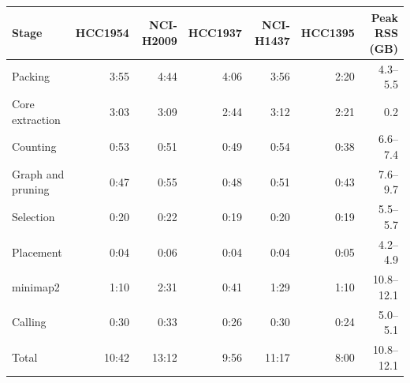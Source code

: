 \begin{tabular}{lrrrrrr}
\toprule
Stage & HCC1954 & NCI-H2009 & HCC1937 & NCI-H1437 & HCC1395 & Peak RSS (GB) \\
\midrule
Packing & 3:55 & 4:44 & 4:06 & 3:56 & 2:20 & 4.3--5.5 \\
Core extraction & 3:03 & 3:09 & 2:44 & 3:12 & 2:21 & 0.2 \\
Counting & 0:53 & 0:51 & 0:49 & 0:54 & 0:38 & 6.6--7.4 \\
Graph and pruning & 0:47 & 0:55 & 0:48 & 0:51 & 0:43 & 7.6--9.7 \\
Selection & 0:20 & 0:22 & 0:19 & 0:20 & 0:19 & 5.5--5.7 \\
Placement & 0:04 & 0:06 & 0:04 & 0:04 & 0:05 & 4.2--4.9 \\
minimap2 & 1:10 & 2:31 & 0:41 & 1:29 & 1:10 & 10.8--12.1 \\
Calling & 0:30 & 0:33 & 0:26 & 0:30 & 0:24 & 5.0--5.1 \\
\midrule
Total & 10:42 & 13:12 & 9:56 & 11:17 & 8:00 & 10.8--12.1 \\
\bottomrule
\end{tabular}

